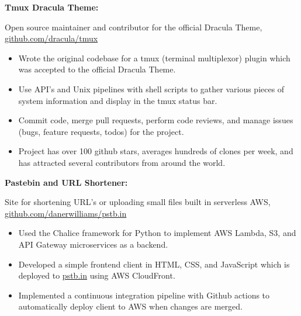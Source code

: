 \documentclass[letterpaper,10pt]{article}
\newcommand{\resumeItem}[2]{
  \item\small{
    {#1}{#2 \vspace{-2pt}}
  }
}
\newcommand{\resumeSubItem}[2]{\resumeItem{#1}{#2}\vspace{-4pt}}
\begin{document}
{      \resumeSubItem{\textbf{Tmux Dracula Theme: }}
      { Open source maintainer and contributor for the official Dracula Theme, \href{https://github.com/dracula/tmux}{github.com/dracula/tmux}
         \vspace{-5pt}
         \begin{itemize}
          \item Wrote the original codebase for a tmux (terminal multiplexor) plugin which was accepted to the official Dracula Theme.
          \vspace{-2pt}
          \item Use API's and Unix pipelines with shell scripts to gather various pieces of system information and display in the tmux status bar.
          \vspace{-2pt}
          \item Commit code, merge pull requests, perform code reviews, and manage issues (bugs, feature requests, todos) for the project.
          \vspace{-2pt}
          \item Project has over 100 github stars, averages hundreds of clones per week, and has attracted several contributors from around the world.
         \end{itemize}
      }

     \vspace{-2pt}

      \resumeSubItem{\textbf{Pastebin and URL Shortener: }}
      { Site for shortening URL's or uploading small files built in serverless AWS, \href{https://github.com/danerwilliams/pstb.in}{github.com/danerwilliams/pstb.in}
         \vspace{-5pt}
         \begin{itemize}
            \item Used the Chalice framework for Python to implement AWS Lambda, S3, and API Gateway microservices as a backend.
            \vspace{-2pt}
            \item Developed a simple frontend client in HTML, CSS, and JavaScript which is deployed to \href{https://www.pstb.in}{pstb.in} using AWS CloudFront.
            \vspace{-2pt}
            \item Implemented a continuous integration pipeline with Github actions to automatically deploy client to AWS when changes are merged.
         \end{itemize}
      }

}
\end{document}
